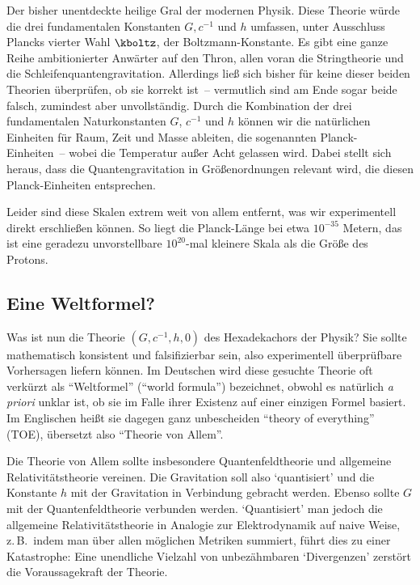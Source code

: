 \documentclass{scrartcl}
\begin{document}
\newpage {}
\label{sec:1110}

Der bisher unentdeckte heilige Gral der modernen Physik. Diese Theorie würde die drei fundamentalen Konstanten $G,c^{−1}$ und $h$ umfassen, unter Ausschluss Plancks vierter Wahl $\kboltz$, der Boltzmann-Konstante. Es gibt eine ganze Reihe ambitionierter Anwärter auf den Thron, allen voran die Stringtheorie und die Schleifenquantengravitation. Allerdings ließ sich bisher für keine dieser beiden Theorien überprüfen, ob sie korrekt ist~-- vermutlich sind am Ende sogar beide falsch, zumindest aber unvollständig. Durch die Kombination der drei fundamentalen Naturkonstanten $G$, $c^{-1}$ und $h$ können wir die natürlichen Einheiten für Raum, Zeit und Masse ableiten, die sogenannten Planck-Einheiten~-- wobei die Temperatur außer Acht gelassen wird. Dabei stellt sich heraus, dass die Quantengravitation in Größenordnungen relevant wird, die diesen Planck-Einheiten entsprechen.

Leider sind diese Skalen extrem weit von allem entfernt, was wir experimentell direkt erschließen können. So liegt die Planck-Länge bei etwa $10^{−35}$ Metern, das ist eine geradezu unvorstellbare $10^{20}$-mal kleinere Skala als die Größe des Protons.


\subsection*{Eine Weltformel?}

Was ist nun die Theorie $(G,c^{-1},h,0)$ des Hexadekachors der Physik? Sie sollte mathematisch konsistent und falsifizierbar sein, also experimentell überprüfbare Vorhersagen liefern können. Im Deutschen wird diese gesuchte Theorie oft verkürzt als \enquote{Weltformel} (\enquote{world formula}) bezeichnet, obwohl es natürlich \textit{a priori} unklar ist, ob sie im Falle ihrer Existenz auf einer einzigen Formel basiert. Im Englischen heißt sie dagegen ganz unbescheiden \enquote{theory of everything} (TOE), übersetzt also \enquote{Theorie von Allem}.

Die Theorie von Allem sollte insbesondere Quantenfeldtheorie und allgemeine Relativitätstheorie vereinen. Die Gravitation soll also \enquote*{quantisiert} und die Konstante $h$ mit der Gravitation in Verbindung gebracht werden. Ebenso sollte $G$ mit der Quantenfeldtheorie verbunden werden. \enquote*{Quantisiert} man jedoch die allgemeine Relativitätstheorie in Analogie zur Elektrodynamik auf naive Weise, z.\,B.\ indem man über allen möglichen Metriken summiert, führt dies zu einer Katastrophe: Eine unendliche Vielzahl von unbezähmbaren \enquote*{Divergenzen} zerstört die Voraussagekraft der Theorie.
\end{document}
